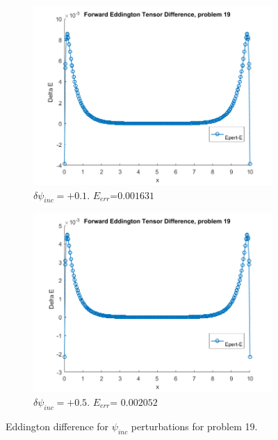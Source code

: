 \documentclass{article}
\begin{document}
\begin{figure}[H]
\centering
\begin{subfigure}{.5\textwidth}
  \centering
  \includegraphics[width=1\linewidth]{p19deltaEdBC0,1.png}
  \caption{$\delta\psi_{inc}=+0.1$. $E_{err}$=$0.001631$}
  \label{fig:sub1}
\end{subfigure}%
\begin{subfigure}{.5\textwidth}
  \centering
  \includegraphics[width=1\linewidth]{p19deltaEdBC0,5.png}
  \caption{$\delta\psi_{inc}=+0.5$. $E_{err}$= $0.002052$}
  \label{fig:sub2}
\end{subfigure}
\caption{Eddington difference for $\psi_{inc}$ perturbations for problem 19.}
\label{fig:test}
\end{figure}
\end{document}
